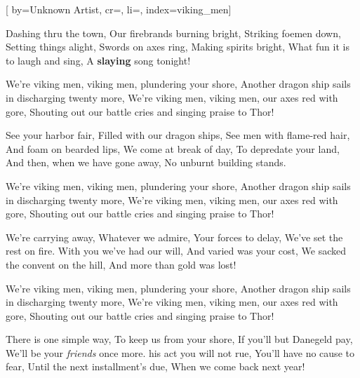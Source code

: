 
[%
    by={Unknown Artist},
    cr={},
    li={},
    index={viking_men}]


    \label{viking_men}

    \beginverse\memorize[verse]
        Dashing thru the town, Our firebrands burning bright,
        Striking foemen down, Setting things alight,
        Swords on axes ring, Making spirits bright,
        What fun it is to laugh and sing, A \textbf{slaying} song tonight!
    \endverse

    \beginchorus\memorize[chorus]
        We're viking men, viking men, plundering your shore,
        Another dragon ship sails in discharging twenty more, We're viking men,
        viking men, our axes red with gore,
        Shouting out our battle cries and singing praise to Thor!
    \endchorus

    \beginverse\replay[verse]
        See your harbor fair, Filled with our dragon ships,
        See men with flame-red hair, And foam on bearded lips,
        We come at break of day, To depredate your land,
        And then, when we have gone away, No unburnt building stands.
    \endverse

    \beginchorus\replay[chorus]
        We're viking men, viking men, plundering your shore,
        Another dragon ship sails in discharging twenty more, We're viking men,
        viking men, our axes red with gore,
        Shouting out our battle cries and singing praise to Thor!
    \endchorus

    \beginverse\replay[verse]
        We're carrying away, Whatever we admire,
        Your forces to delay, We've set the rest on fire.
        With you we've had our will, And varied was your cost,
        We sacked the convent on the hill, And more than gold was lost!
    \endverse

    \beginchorus\replay[chorus]
        We're viking men, viking men, plundering your shore,
        Another dragon ship sails in discharging twenty more, We're viking men,
        viking men, our axes red with gore,
        Shouting out our battle cries and singing praise to Thor!
    \endchorus

    \beginverse\replay[verse]
        There is one simple way, To keep us from your shore,
        If you'll but Danegeld pay,
        We'll be your \textit{friends} once more.
        his act you will not rue, You'll have no cause to fear,
        Until the next installment's due, When we come back next year!
    \endverse

